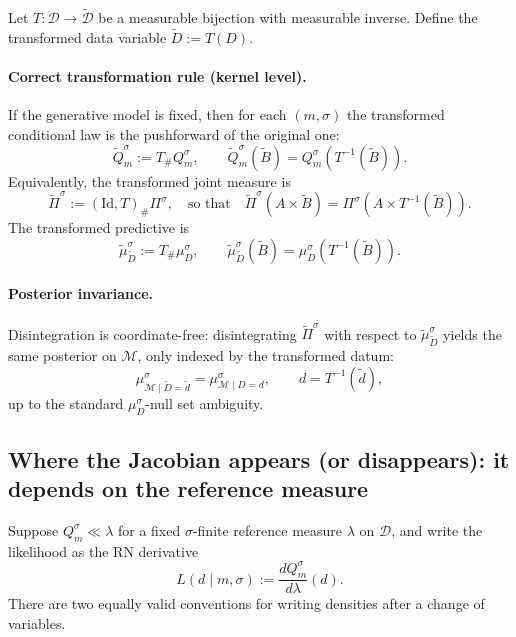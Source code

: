 \documentclass[11pt]{article}
\theoremstyle{remark}
\newcommand{\modelspace}{\mathcal{M}}
\newcommand{\dataspace}{\mathcal{D}}
\begin{document}
Let \(T:\dataspace\to\tilde{\dataspace}\) be a measurable bijection with measurable inverse.
Define the transformed data variable \(\tilde D:=T(D)\).

\paragraph{Correct transformation rule (kernel level).}
If the generative model is fixed, then for each \((m,\sigma)\) the transformed conditional law is
the pushforward of the original one:
\begin{equation}\label{eq:pushforward-kernel}
\tilde Q_m^\sigma := T_{\#}Q_m^\sigma,
\qquad
\tilde Q_m^\sigma(\tilde B)=Q_m^\sigma(T^{-1}(\tilde B)).
\end{equation}
Equivalently, the transformed joint measure is
\[
\tilde\Pi^\sigma := (\mathrm{Id},T)_{\#}\Pi^\sigma,
\quad\text{so that}\quad
\tilde\Pi^\sigma(A\times \tilde B)=\Pi^\sigma(A\times T^{-1}(\tilde B)).
\]
The transformed predictive is
\begin{equation}\label{eq:pushforward-predictive}
\tilde\mu_{\tilde D}^\sigma := T_{\#}\mu_D^\sigma,
\qquad
\tilde\mu_{\tilde D}^\sigma(\tilde B)=\mu_D^\sigma(T^{-1}(\tilde B)).
\end{equation}

\paragraph{Posterior invariance.}
Disintegration is coordinate-free: disintegrating \(\tilde\Pi^\sigma\) with respect to
\(\tilde\mu_{\tilde D}^\sigma\) yields the same posterior on \(\modelspace\), only indexed by the
transformed datum:
\begin{equation}\label{eq:posterior-invariance}
\mu_{\modelspace\mid \tilde D=\tilde d}^\sigma
=
\mu_{\modelspace\mid D=d}^\sigma,
\qquad d=T^{-1}(\tilde d),
\end{equation}
up to the standard \(\mu_D^\sigma\)-null set ambiguity.

\subsection{Where the Jacobian appears (or disappears): it depends on the reference measure}

Suppose \(Q_m^\sigma\ll \lambda\) for a fixed \(\sigma\)-finite reference measure \(\lambda\) on \(\dataspace\),
and write the likelihood as the RN derivative
\[
L(d\mid m,\sigma):=\frac{dQ_m^\sigma}{d\lambda}(d).
\]
There are two equally valid conventions for writing densities after a change of variables.
\end{document}
